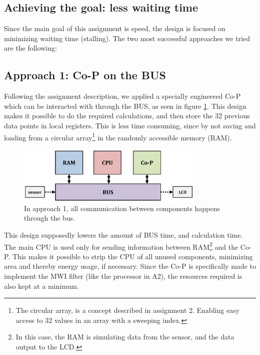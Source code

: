 
\subsection{Achieving the goal: less waiting time}

Since the main goal of this assignment is speed, the design is focused on minimizing waiting time (stalling). The two most successful approaches we tried are the following:\\

\subsection{Approach 1: Co-P on the BUS}

Following the assignment description, we applied a specially engineered Co-P which can be interacted with through the BUS, as seen in figure \ref{fig:designBus1}. This design makes it possible to do the required calculations, and then store the 32 previous data points in local registers. This is less time consuming, since by not saving and loading from a circular array\footnote{The circular array, is a concept described in assignment 2. Enabling easy access to 32 values in an array with a sweeping index.} in the randomly accessible memory (RAM). \\ 

\begin{figure}[H]
    \centering
    \includegraphics[width=0.8\textwidth]{1Design/fig/designBus1.pdf}
    \caption{In approach 1, all communication between components happens through the bus.}
    \label{fig:designBus1}
\end{figure}

This design supposedly lowers the amount of BUS time, and calculation time. The main CPU is used only for sending information between RAM\footnote{In this case, the RAM is simulating data from the sensor, and the data output to the LCD.} and the Co-P. This makes it possible to strip the CPU of all unused components, minimizing area and thereby energy usage, if necessary. Since the Co-P is specifically made to implement the MWI filter (like the processor in A2), the resources required is also kept at a minimum. 

